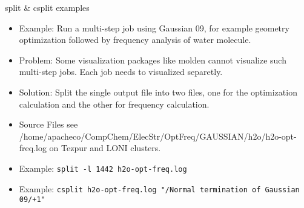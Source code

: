\documentclass[slidestop,mathserif,compress,xcolor=svgnames]{beamer}
\begin{document}
\begin{frame}{\small split \& csplit examples}
  \begin{itemize}
    \item Example: Run a multi-step job using Gaussian 09, for example geometry optimization followed by frequency analysis of water molecule.
    \item Problem: Some visualization packages like molden cannot visualize such multi-step jobs. Each job needs to visualized separetly.
    \item Solution: Split the single output file into two files, one for the optimization calculation and the other for frequency calculation.
    \item Source Files see /home/apacheco/CompChem/ElecStr/OptFreq/GAUSSIAN/h2o/h2o-opt-freq.log on Tezpur and LONI clusters.
    \item Example: \texttt{split -l 1442 h2o-opt-freq.log}
    \item Example: \texttt{csplit h2o-opt-freq.log "/Normal termination of Gaussian 09/+1"}
  \end{itemize}
\end{frame}
\end{document}
